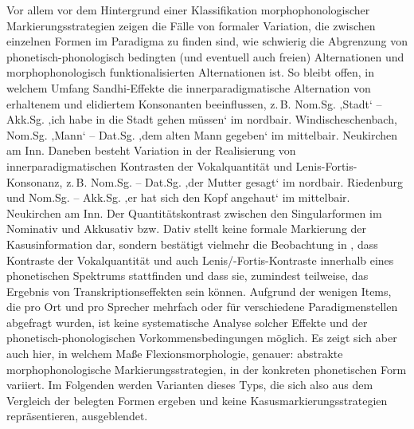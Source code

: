 Vor allem vor dem Hintergrund einer Klassifikation morphophonologischer Markierungsstrategien zeigen die Fälle von formaler Variation, die zwischen einzelnen Formen im Paradigma zu finden sind, wie schwierig die Abgrenzung von phonetisch-phonologisch bedingten (und eventuell auch freien) Alternationen und morphophonologisch funktionalisierten Alternationen ist. So bleibt offen, in welchem Umfang Sandhi-Effekte die innerparadigmatische Alternation von erhaltenem und elidiertem Konsonanten beeinflussen, z.\,B. Nom.Sg.  ‚Stadt‘ -- Akk.Sg.      ‚ich habe in die Stadt gehen müssen‘ im nordbair. Windischeschenbach, Nom.Sg.  ‚Mann‘ -- Dat.Sg.     ‚dem alten Mann gegeben‘ im mittelbair. Neukirchen am Inn. Daneben besteht Variation in der Realisierung von innerparadigmatischen Kontrasten der Vokalquantität und Lenis-Fortis-Konsonanz, z.\,B. Nom.Sg.  -- Dat.Sg.    ‚der Mutter gesagt‘ im nordbair. Riedenburg und Nom.Sg.  -- Akk.Sg.      ‚er hat sich den Kopf angehaut‘ im mittelbair. Neukirchen am Inn. Der Quantitätskontrast zwischen den Singularformen im Nominativ und Akkusativ bzw. Dativ stellt keine formale Markierung der Kasusinformation dar, sondern bestätigt vielmehr die Beobachtung in , dass Kontraste der Vokalquantität und auch Lenis/-Fortis-Kontraste innerhalb eines phonetischen Spektrums stattfinden und dass sie, zumindest teilweise, das Ergebnis von Transkriptionseffekten sein können. Aufgrund der wenigen Items, die pro Ort und pro Sprecher mehrfach oder für verschiedene Paradigmenstellen abgefragt wurden, ist keine systematische Analyse solcher Effekte und der phonetisch-phonologischen Vorkommensbedingungen möglich. Es zeigt sich aber auch hier, in welchem Maße Flexionsmorphologie, genauer: abstrakte morphophonologische Markierungsstrategien, in der konkreten phonetischen Form variiert. Im Folgenden werden Varianten dieses Typs, die sich also aus dem Vergleich der belegten Formen ergeben und keine Kasusmarkierungsstrategien repräsentieren, ausgeblendet.

